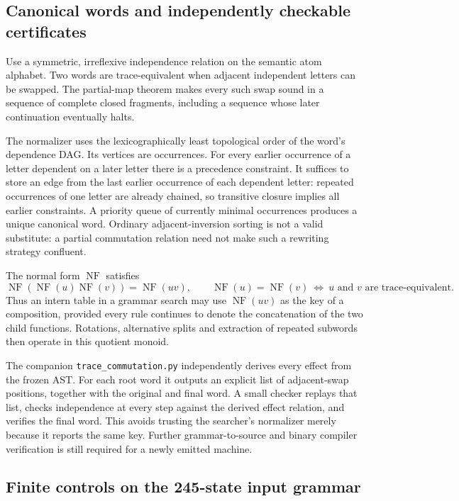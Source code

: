 \subsection{Canonical words and independently checkable certificates}

Use a symmetric, irreflexive independence relation on the semantic atom
alphabet. Two words are trace-equivalent when adjacent independent
letters can be swapped. The partial-map theorem makes every such swap
sound in a sequence of complete closed fragments, including a sequence
whose later continuation eventually halts.

The normalizer uses the lexicographically least topological order of the
word's dependence DAG. Its vertices are occurrences. For every earlier
occurrence of a letter dependent on a later letter there is a precedence
constraint. It suffices to store an edge from the last earlier occurrence
of each dependent letter: repeated occurrences of one letter are already
chained, so transitive closure implies all earlier constraints. A priority
queue of currently minimal occurrences produces a unique canonical word.
Ordinary adjacent-inversion sorting is not a valid substitute: a partial
commutation relation need not make such a rewriting strategy confluent.

The normal form $\operatorname{NF}$ satisfies
\[
\operatorname{NF}(\operatorname{NF}(u)\operatorname{NF}(v))
 =\operatorname{NF}(uv),
\qquad
\operatorname{NF}(u)=\operatorname{NF}(v)
\ \Longleftrightarrow\ u\text{ and }v\text{ are trace-equivalent}.
\]
Thus an intern table in a grammar search may use
$\operatorname{NF}(uv)$ as the key of a composition, provided every rule
continues to denote the concatenation of the two child functions.
Rotations, alternative splits and extraction of repeated subwords then
operate in this quotient monoid.

The companion \texttt{trace\_commutation.py} independently derives every
effect from the frozen AST. For each root word it outputs an explicit
list of adjacent-swap positions, together with the original and final
word. A small checker replays that list, checks independence at every
step against the derived effect relation, and verifies the final word.
This avoids trusting the searcher's normalizer merely because it reports
the same key. Further grammar-to-source and binary compiler verification
is still required for a newly emitted machine.

\subsection{Finite controls on the 245-state input grammar}

